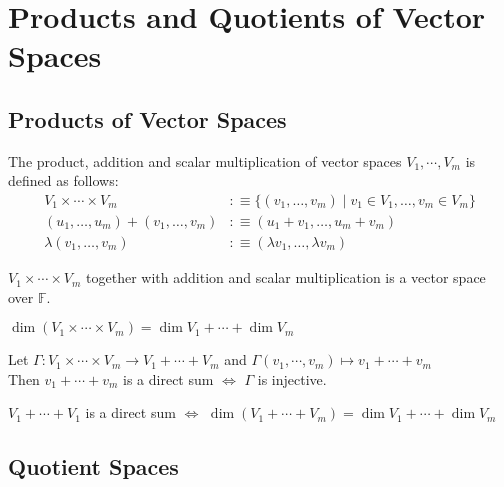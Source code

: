 \section{Products and Quotients of Vector Spaces}
\subsection{Products of Vector Spaces}

\begin{mydef}The product, addition and scalar multiplication of vector spaces $V_1, \cdots, V_m$ is defined as follows:
  \begin{equation}
    \begin{aligned}
      V_1 \times \cdots \times V_m &:\equiv \{ (v_1, \dots, v_m) \mid v_1 \in V_1, \dots, v_m \in V_m\} \\
      (u_1, \dots, u_m) + (v_1, \dots, v_m) &:\equiv (u_1+v_1, \dots, u_m+v_m) \\
      \lambda (v_1, \dots, v_m) &:\equiv (\lambda v_1, \dots, \lambda v_m)
    \end{aligned}
  \end{equation}
\end{mydef}

\setcounter{thm}{88}
\begin{thm}
  $V_1 \times \cdots \times V_m$ together with addition and scalar multiplication is a vector space over $\mathbb{F}$.
\end{thm}

\setcounter{thm}{91}
\begin{thm}
  $\dim (V_1 \times \cdots \times V_m) = \dim V_1 + \cdots + \dim V_m$
\end{thm}

\begin{thm}
  Let $\Gamma: V_1 \times \cdots \times V_m \to V_1 + \cdots + V_m$ and
  $ \Gamma(v_1, \cdots, v_m) \mapsto v_1 + \cdots + v_m$ \\
  Then $v_1 + \cdots + v_m$ is a direct sum $\iff$ $\Gamma$ is injective.
\end{thm}

\begin{thm}$V_1 + \cdots + V_1$ is a direct sum $\iff$
  $\dim (V_1+\cdots+V_m) = \dim V_1 + \cdots + \dim V_m$
\end{thm}

\subsection{Quotient Spaces}


